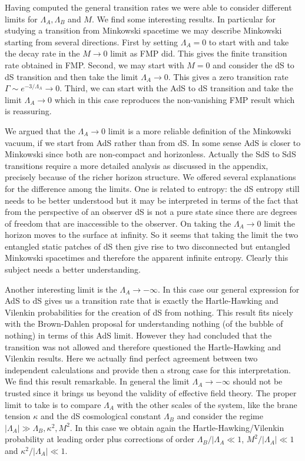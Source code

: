 \documentclass[a4paper,11pt]{article}
\numberwithin{equation}{section}
\numberwithin{equation}{section}
\begin{document}
Having computed the general transition rates we were able to  consider  different limits for $\Lambda_A, \Lambda_B$ and $M$. We find some interesting results. In particular for studying a transition from Minkowski spacetime we may describe Minkowski starting from several directions. First by setting $\Lambda_A=0$ to start with and take the decay rate in the $M\rightarrow 0$ limit as FMP did. This gives the finite transition rate obtained in FMP. Second, we may start with $M=0$ and consider the dS to dS transition and then take the limit $\Lambda_A\rightarrow 0$. This gives a zero transition rate $\Gamma\sim e^{-3/\Lambda_A}\rightarrow 0$. Third, we can start with the AdS to dS transition and take the limit $\Lambda_A\rightarrow 0$ which in this case reproduces the non-vanishing FMP result which is reassuring. 
\vskip 1mm

We argued that the $\Lambda_A\rightarrow 0$ limit is a more reliable definition of the Minkowski vacuum, if we start from AdS rather than from dS. In some sense AdS is  closer to Minkowski  since both are non-compact and  horizonless. Actually the SdS to SdS transitions require a more detailed analysis as discussed in the appendix, precisely because of the richer horizon structure. We offered several explanations for the difference among the limits. One is related to entropy: the dS entropy still needs to be better understood but it may be interpreted in terms of the fact that from the perspective of an observer dS is not a pure state since there are degrees of freedom that are inaccessible to the observer. On taking the $\Lambda_A\rightarrow 0$ limit the horizon moves to the surface at infinity. So it seems that  taking the limit the two entangled static patches of dS  then give rise to two disconnected but entangled Minkowski spacetimes and therefore the apparent infinite entropy. Clearly this subject needs a better understanding.
\vskip 1mm


Another interesting limit is the $\Lambda_A\rightarrow -\infty $. In this case our general expression for AdS to dS gives us a transition rate that is exactly the Hartle-Hawking and Vilenkin probabilities for the creation of dS from nothing. This result fits nicely with the Brown-Dahlen proposal for understanding nothing (of the bubble of nothing) in terms of this AdS limit. However they had concluded that the transition was not allowed and therefore questioned the Hartle-Hawking and Vilenkin results. Here we actually find perfect agreement between two independent calculations and provide then a strong case for this interpretation. We find this result remarkable. In general the limit $\Lambda_A\rightarrow -\infty $ should not be trusted since it brings us beyond the validity of effective field theory. The proper limit to take is to compare $\Lambda_A$ with the other scales of the system, like the brane tension $\kappa$ and the dS cosmological constant $\Lambda_B$ and consider the regime $|\Lambda_A| \gg  \Lambda_B, \kappa^2, M^2$. In this case we obtain again the Hartle-Hawking/Vilenkin probability at leading order plus corrections of order
$\Lambda_B/|\Lambda_A \ll 1$, $ M^2/|\Lambda_A| \ll 1$ and $\kappa^2/|\Lambda_A| \ll 1$. 
\vskip 1mm 
\end{document}
